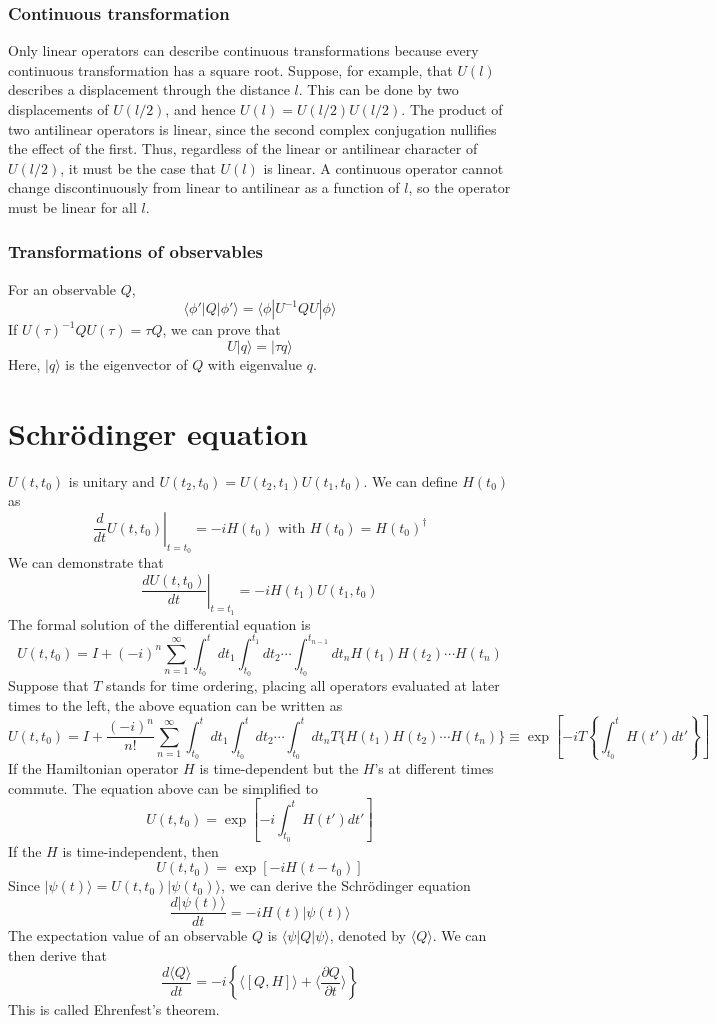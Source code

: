 \subsubsection{Continuous transformation} 
Only linear operators can describe continuous transformations because every continuous transformation has a square root. Suppose, for example, that $U(l)$ describes a displacement through the distance $l$. This can be done by two displacements of $U(l/2)$, and hence $U(l) = U(l/2) U(l/2)$. The product of two antilinear operators is linear, since the second complex conjugation nullifies the effect of the first. Thus, regardless of the linear or antilinear character of $U(l/2)$, it must be the case that $U(l)$ is linear. A continuous operator cannot change discontinuously from linear to antilinear as a function of $l$, so the operator must be linear for all $l$.

\subsubsection{Transformations of observables}
\noindent
For an observable $Q$, 
\[\langle \phi' | Q | \phi' \rangle = \langle \phi | U^{-1}QU | \phi \rangle \]
If $U(\tau)^{-1}QU(\tau) = \tau Q$, we can prove that
\[U|q\rangle = |\tau q\rangle\]
Here, $|q\rangle$ is the eigenvector of $Q$ with eigenvalue $q$. 


\section{Schr\"{o}dinger equation}
\noindent
$U(t,t_0)$ is unitary and $U(t_2,t_0) = U(t_2,t_1)U(t_1,t_0)$. We can define $H(t_0)$ as
\[\left. \frac{d}{dt}U(t,t_0)\right|_{t=t_0} = -iH(t_0) \mbox{ with } H(t_0) = H(t_0)^{\dagger}\]
We can demonstrate that
\[\left. \frac{dU(t,t_0)}{dt}\right|_{t=t_1} = -iH(t_1)U(t_1,t_0) \]
The formal solution of the differential equation is
\[U(t,t_0) = I + (-i)^n \sum_{n=1}^{\infty} \int_{t_0}^{t}dt_1 \int_{t_0}^{t_1}dt_2 \cdots \int_{t_0}^{t_{n-1}} dt_n H(t_1)H(t_2)\cdots H(t_n)\]
Suppose that $T$ stands for time ordering, placing all operators evaluated at later times to the left, the above equation can be written as
\[U(t,t_0) = I + \frac{(-i)^n}{n!} \sum_{n=1}^{\infty} \int_{t_0}^{t}dt_1 \int_{t_0}^{t}dt_2 \cdots \int_{t_0}^{t} dt_n T\{H(t_1)H(t_2)\cdots H(t_n)\} \equiv \exp \left[ -i T\left\{ \int_{t_0}^{t} H(t')dt'\right\} \right] \]
If the Hamiltonian operator $H$ is time-dependent but the $H$'s at different times commute. The equation above can be simplified to
\[U(t,t_0) = \exp \left[ -i \int_{t_0}^{t} H(t')dt' \right] \]
If the $H$ is time-independent, then
\[U(t,t_0) = \exp \left[ -i H(t-t_0) \right] \]
Since $|\psi(t)\rangle = U(t,t_0) |\psi(t_0)\rangle$, we can derive the Schr\"{o}dinger equation
\[\frac{d |\psi(t)\rangle}{dt} = -iH(t) |\psi(t)\rangle\]
The expectation value of an observable $Q$ is $\langle \psi | Q | \psi \rangle$, denoted by $\langle Q \rangle$. We can then derive that
\[\frac{d\langle Q \rangle}{dt} = -i \left\{ \langle [Q,H] \rangle + \langle \frac{\partial Q}{\partial t} \rangle \right\}\]
This is called Ehrenfest's theorem. 

